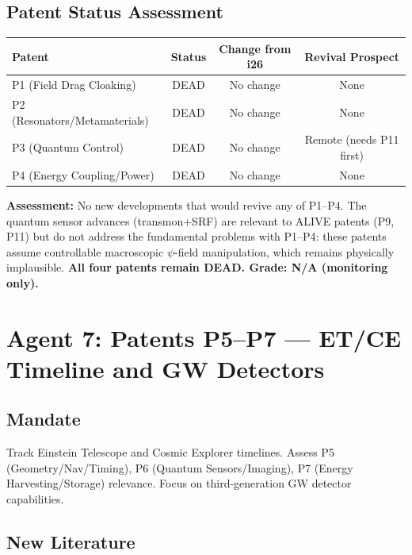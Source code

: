 \documentclass[11pt,a4paper]{article}
\begin{document}
\subsection{Patent Status Assessment}

\begin{center}
\begin{tabular}{lccc}
\toprule
\textbf{Patent} & \textbf{Status} & \textbf{Change from i26} & \textbf{Revival Prospect} \\
\midrule
P1 (Field Drag Cloaking) & DEAD & No change & None \\
P2 (Resonators/Metamaterials) & DEAD & No change & None \\
P3 (Quantum Control) & DEAD & No change & Remote (needs P11 first) \\
P4 (Energy Coupling/Power) & DEAD & No change & None \\
\bottomrule
\end{tabular}
\end{center}

\textbf{Assessment:} No new developments that would revive any of P1--P4. The quantum sensor advances (transmon+SRF) are relevant to ALIVE patents (P9, P11) but do not address the fundamental problems with P1--P4: these patents assume controllable macroscopic $\psi$-field manipulation, which remains physically implausible. \textbf{All four patents remain DEAD. Grade: N/A (monitoring only).}

\section{Agent 7: Patents P5--P7 --- ET/CE Timeline and GW Detectors}

\subsection{Mandate}
Track Einstein Telescope and Cosmic Explorer timelines. Assess P5 (Geometry/Nav/Timing), P6 (Quantum Sensors/Imaging), P7 (Energy Harvesting/Storage) relevance. Focus on third-generation GW detector capabilities.

\subsection{New Literature}
\end{document}
